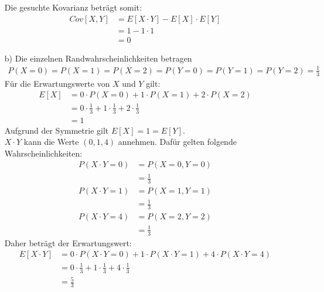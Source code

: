 \begin{enumerate}
	Die gesuchte Kovarianz beträgt somit:
	\begin{equation*}
		\begin{split}
			Cov[X,Y]	&= E[X\cdot Y] - E[X] \cdot E[Y]\\
						&= 1 - 1 \cdot 1\\
						&= 0
		\end{split}
	\end{equation*}
	\item[b)] Die einzelnen Randwahrscheinlichkeiten betragen
	\begin{equation*}
		\begin{split}
			P(X = 0) = P(X = 1) = P(X = 2) = P(Y = 0) = P(Y = 1) = P(Y = 2) = \frac{1}{3}
		\end{split}
	\end{equation*}
	Für die Erwartungswerte von $X$ und $Y$ gilt:
	\begin{equation*}
		\begin{split}
			E[X]	&= 0 \cdot P(X = 0) + 1 \cdot P(X = 1) + 2 \cdot P(X = 2)\\
					&= 0 \cdot \frac{1}{3} + 1 \cdot \frac{1}{3} + 2 \cdot \frac{1}{3}\\
					&= 1
		\end{split}
	\end{equation*}
	Aufgrund der Symmetrie gilt $E[X] = 1 = E[Y]$.\\
	$X \cdot Y$ kann die Werte $(0,1,4)$ annehmen. Dafür gelten folgende Wahrscheinlichkeiten:
	\begin{equation*}
		\begin{split}
			P(X \cdot Y = 0) 	&= P(X = 0, Y = 0)\\
								&= \frac{1}{3}\\
			P(X \cdot Y = 1)	&= P(X = 1, Y = 1)\\
								&= \frac{1}{3}\\
			P(X \cdot Y = 4)	&= P(X = 2, Y = 2)\\
								&= \frac{1}{3}
		\end{split}
	\end{equation*}
	Daher beträgt der Erwartungswert:
	\begin{equation*}
		\begin{split}
			E[X \cdot Y]	&= 0 \cdot P(X \cdot Y = 0) + 1 \cdot P(X \cdot Y = 1) + 4 \cdot P(X \cdot Y = 4)\\
							&= 0 \cdot \frac{1}{3} + 1 \cdot \frac{1}{3} + 4 \cdot \frac{1}{3}\\
							&= \frac{5}{3}
		\end{split}

\end{equation*}
\end{enumerate}
